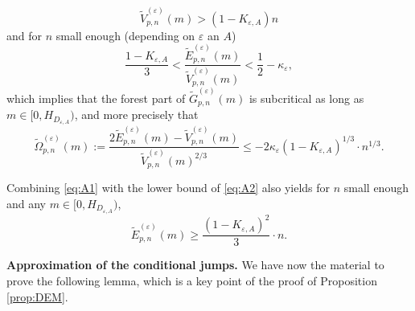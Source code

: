 \documentclass[a4, 11pt]{article}
\numberwithin{equation}{section}
\theoremstyle{plain}
\theoremstyle{definition}
\theoremstyle{remark}
\begin{document}
\begin{equation}\label{eq:A1}
	\tilde{V}^{(\varepsilon)}_{p,n}(m)> \left(1-K_{\varepsilon,A}\right)n \tag{A1}
\end{equation}
and for $n$ small enough (depending on $\varepsilon$ an $A$)
\begin{equation}\label{eq:A2}
	\frac{1-{K}_{\varepsilon,A}}{3}<\frac{\tilde{E}^{(\varepsilon)}_{p,n}(m)}{\tilde{V}^{(\varepsilon)}_{p,n}(m)}<\frac{1}{2}-\kappa_{\varepsilon},\tag{A2}
\end{equation}
which implies that the forest part of $\tilde{G}^{(\varepsilon)}_{p,n}(m)$ is subcritical as long as $m\in \big[0,H_{D_{\varepsilon,A}}\big)$, and more precisely that
\begin{equation}\label{eq:A4}
\tilde \Omega_{p,n}^{(\varepsilon)}(m):=\frac{2\tilde E_{p,n}^{(\varepsilon)}(m)-\tilde V_{p,n}^{(\varepsilon)}(m)}{\tilde V_{p,n}^{(\varepsilon)}(m)^{2/3}} \leq -2\kappa_{\varepsilon}(1-K_{\varepsilon,A})^{1/3} \cdot n^{1/3}.\tag{A3}
\end{equation} 

Combining \eqref{eq:A1} with the lower bound of \eqref{eq:A2} also yields for $n$ small enough and any $m\in \big[0,H_{D_{\varepsilon,A}}\big)$,
\begin{equation}\label{eq:A3}
	\tilde{E}^{(\varepsilon)}_{p,n}(m)\geq \frac{(1-K_{\varepsilon,A})^2}{3} \cdot n.\tag{A4}
\end{equation} 

\bigskip

\textbf{Approximation of the conditional jumps.} We have now the material to prove the following lemma, which is a key point of the proof of Proposition \ref{prop:DEM}. 
\end{document}
